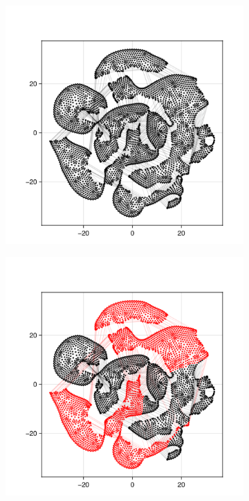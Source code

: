  \begin{figure}[h!]
    \centering
    \begin{subfigure}[b]{0.23\textwidth}
        \centering
        \includegraphics[trim={0 0 0 2.5cm}, clip, width=1.1\textwidth]{images/plot_ex_1.png}
        \label{fig:visu_simple}
    \end{subfigure}
    \hfill
    \begin{subfigure}[b]{0.23\textwidth}
        \centering
        \includegraphics[trim={0 0 0 2.5cm}, clip, width=1.1\textwidth]{images/plot_ex_2.png}

\end{subfigure}
\end{figure}
